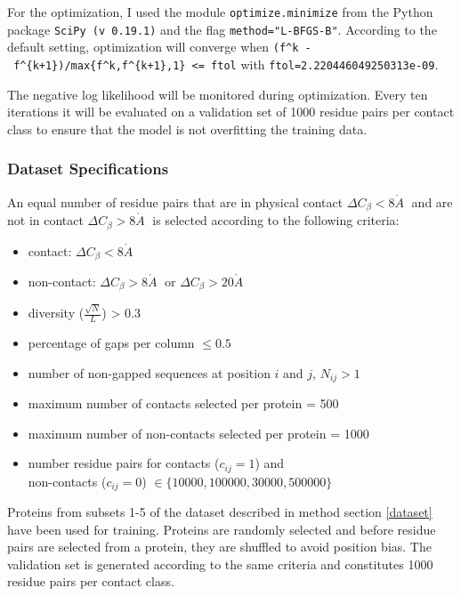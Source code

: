 \documentclass[11pt,a4paper,twoside]{book}
\providecommand{\tightlist}{%
  \setlength{\itemsep}{0pt}\setlength{\parskip}{0pt}}
\newcommand{\Cb}{C_\beta}
\newcommand{\eq}{\!=\!}
\newcommand{\cij}{c_{ij}}
\newcommand{\angstrom}{\mathring{A} \;}
\theoremstyle{definition}
\theoremstyle{definition}
\theoremstyle{remark}
\begin{document}
For the optimization, I used the module \texttt{optimize.minimize} from
the Python package \texttt{SciPy\ (v\ 0.19.1)} and the flag
\texttt{method="L-BFGS-B"}. According to the default setting,
optimization will converge when
\texttt{(f\^{}k\ -\ f\^{}\{k+1\})/max\{\textbar{}f\^{}k\textbar{},\textbar{}f\^{}\{k+1\}\textbar{},1\}\ \textless{}=\ ftol}
with \texttt{ftol=2.220446049250313e-09}.

The negative log likelihood will be monitored during optimization. Every
ten iterations it will be evaluated on a validation set of 1000 residue
pairs per contact class to ensure that the model is not overfitting the
training data.

\subsubsection{Dataset
Specifications}\label{dataset-training-bayesian-model}

An equal number of residue pairs that are in physical contact
\(\Delta\Cb <8 \angstrom\) and are not in contact
\(\Delta\Cb >8 \angstrom\) is selected according to the following
criteria:

\begin{itemize}
\tightlist
\item
  contact: \(\Delta\Cb <8 \angstrom\)
\item
  non-contact: \(\Delta\Cb >8 \angstrom\) or \(\Delta\Cb >20 \angstrom\)
\item
  diversity (\(\frac{\sqrt{N}}{L}\)) \textgreater{} 0.3
\item
  percentage of gaps per column \(\leq 0.5\)
\item
  number of non-gapped sequences at position \(i\) and \(j\),
  \(N_{ij} > 1\)
\item
  maximum number of contacts selected per protein = 500
\item
  maximum number of non-contacts selected per protein = 1000
\item
  number residue pairs for contacts (\(\cij \eq 1\)) and\\
  non-contacts (\(\cij \eq 0\))
  \(\in \{10000, 100000, 30000, 500000 \}\)
\end{itemize}

Proteins from subsets 1-5 of the dataset described in method section
\ref{dataset} have been used for training. Proteins are randomly
selected and before residue pairs are selected from a protein, they are
shuffled to avoid position bias. The validation set is generated
according to the same criteria and constitutes 1000 residue pairs per
contact class.
\end{document}
